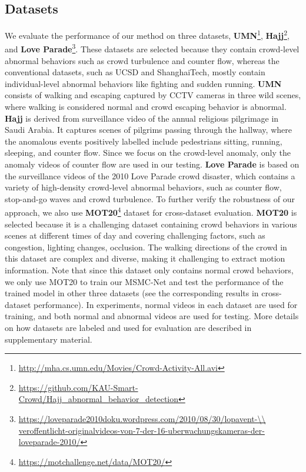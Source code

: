 \documentclass[journal]{IEEEtran}
\begin{document}
\subsection{Datasets}
\noindent We evaluate the performance of our method on three datasets, \textbf{UMN}\footnote{\url{http://mha.cs.umn.edu/Movies/Crowd-Activity-All.avi}}, \textbf{Hajj}\footnote{\url{https://github.com/KAU-Smart-Crowd/Hajj_abnormal_behavior_detection}}, and \textbf{Love Parade}\footnote{\url{https://loveparade2010doku.wordpress.com/2010/08/30/lopavent-\\ veroffentlicht-originalvideos-von-7-der-16-uberwachungskameras-der-loveparade-2010/}}. These datasets are selected because they contain crowd-level abnormal behaviors such as crowd turbulence and counter flow, whereas the conventional datasets, such as UCSD and ShanghaiTech, mostly contain individual-level abnormal behaviors like fighting and sudden running. \textbf{UMN} consists of walking and escaping captured by CCTV cameras in three wild scenes, where walking is considered normal and crowd escaping behavior is abnormal. \textbf{Hajj} is derived from surveillance video of the annual religious pilgrimage in Saudi Arabia. It captures scenes of pilgrims passing through the hallway, where the anomalous events positively labelled include pedestrians sitting, running, sleeping, and counter flow. Since we focus on the crowd-level anomaly, only the anomaly videos of counter flow are used in our testing. \textbf{Love Parade} is based on the surveillance videos of the 2010 Love Parade crowd disaster, which contains a variety of high-density crowd-level abnormal behaviors, such as counter flow, stop-and-go waves and crowd turbulence. To further verify the robustness of our approach, we also use \textbf{MOT20}\footnote{\url{https://motchallenge.net/data/MOT20/}} dataset for cross-dataset evaluation. \textbf{MOT20} is selected because it is a challenging dataset containing crowd behaviors in various scenes at different times of day and covering challenging factors, such as congestion, lighting changes, occlusion. The walking directions of the crowd in this dataset are complex and diverse, making it challenging to extract motion information. Note that since this dataset only contains normal crowd behaviors, we only use MOT20 to train our MSMC-Net and test the performance of the trained model in other three datasets (see the corresponding results in cross-dataset performance). In experiments, normal videos in each dataset are used for training, and both normal and abnormal videos are used for testing. More details on how datasets are labeled and used for evaluation are described in supplementary material. 
\end{document}
